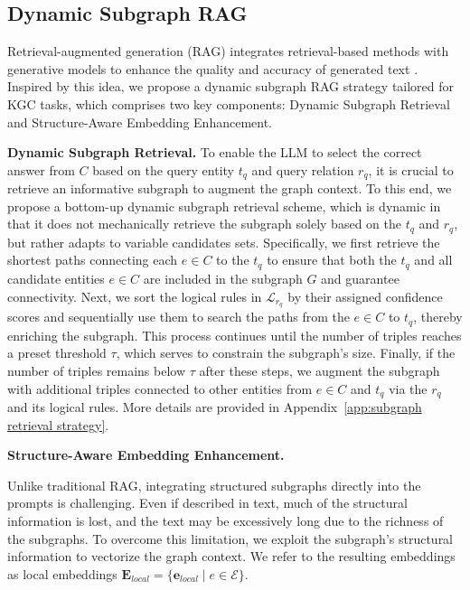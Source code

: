\documentclass[11pt]{article}
\begin{document}
\subsection{Dynamic Subgraph RAG}
Retrieval-augmented generation (RAG) integrates retrieval-based methods with generative models to enhance the quality and accuracy of generated text \citep{lewis2020retrieval}. Inspired by this idea, we propose a dynamic subgraph RAG strategy tailored for KGC tasks, which comprises two key components: Dynamic Subgraph Retrieval and Structure-Aware Embedding Enhancement. 

\noindent \textbf{Dynamic Subgraph Retrieval.} 
To enable the LLM to select the correct answer from $C$ based on the query entity  $t_q$ and query relation $r_q$, it is crucial to retrieve an informative subgraph to augment the graph context. To this end, we propose a bottom-up dynamic subgraph retrieval scheme, which is dynamic in that it does not mechanically retrieve the subgraph solely based on the $t_q$ and $r_q$, but rather adapts to variable candidates sets. Specifically, we first retrieve the shortest paths connecting each $e \in C$ to the $t_q$ to  ensure that both the $t_q$ and all candidate entities $e \in C$ are included in the subgraph $G$ and guarantee connectivity. Next, we sort the logical rules in $\mathcal{L}_{r_q}$ by their assigned confidence 
scores and sequentially use them to search the paths from the $e \in C$ to $t_q$, thereby enriching the subgraph. This process continues until the number of triples reaches a preset threshold $\tau$, which serves to constrain the subgraph's size. Finally, if the number of triples remains below $\tau$ after these steps, we augment the subgraph with additional triples connected to other entities from $e \in C$ and $t_q$ via the $r_q$ and its logical rules. More details are provided in Appendix~\ref{app:subgraph retrieval strategy}.

\noindent \textbf{Structure-Aware Embedding Enhancement.} 

Unlike traditional RAG, integrating structured subgraphs directly into the prompts is challenging. Even if described in text, much of the structural information is lost, and the text may be excessively long due to the richness of the subgraphs. To overcome this limitation, we exploit the subgraph’s structural information to vectorize the graph context. We refer to the resulting embeddings as local embeddings $\mathbf{E}_{local} = \{ \mathbf{e}_{local} \mid e \in \mathcal{E} \}$.
\end{document}
